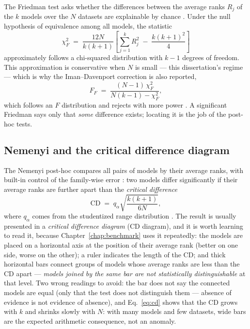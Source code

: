 The Friedman test asks whether the differences between the average
ranks $R_j$ of the $k$ models over the $N$ datasets are explainable
by chance \citep{friedman1937}. Under the null hypothesis of
equivalence among all models, the statistic
\begin{equation}
  \chi^2_F \;=\; \frac{12N}{k(k+1)}
  \left[ \sum_{j=1}^{k} R_j^2 \;-\; \frac{k(k+1)^2}{4} \right]
  \label{eq:friedman}
\end{equation}
approximately follows a chi-squared distribution with $k-1$ degrees
of freedom. This approximation is conservative when $N$ is small
--- this dissertation's regime --- which is why the Iman--Davenport
correction is also reported,
\begin{equation}
  F_F \;=\; \frac{(N-1)\,\chi^2_F}{N(k-1) - \chi^2_F},
  \label{eq:iman-davenport}
\end{equation}
which follows an $F$ distribution and rejects with more power
\citep{imandavenport1980}. A significant Friedman says only that
\emph{some} difference exists; locating it is the job of the
post-hoc tests.

\subsection{Nemenyi and the critical difference diagram}

The Nemenyi post-hoc compares all pairs of models by their average
ranks, with built-in control of the family-wise error
\citep{nemenyi1963}: two models differ significantly if their
average ranks are further apart than the \emph{critical difference}
\begin{equation}
  \mathrm{CD} \;=\; q_\alpha \sqrt{\frac{k(k+1)}{6N}},
  \label{eq:cd}
\end{equation}
where $q_\alpha$ comes from the studentized range distribution
\citep{demsar2006}. The result is usually presented in a
\emph{critical difference diagram} (CD diagram), and it is worth
learning to read it, because Chapter~\ref{chap:benchmark} uses it
repeatedly: the models are placed on a horizontal axis at the
position of their average rank (better on one side, worse on the
other); a ruler indicates the length of the CD; and thick
horizontal bars connect groups of models whose average ranks are
less than the CD apart --- \emph{models joined by the same bar are
not statistically distinguishable} at that level. Two wrong
readings to avoid: the bar does not say the connected models are
equal (only that the test does not distinguish them --- absence of
evidence is not evidence of absence), and Eq.~\ref{eq:cd} shows
that the CD grows with $k$ and shrinks slowly with $N$: with many
models and few datasets, wide bars are the expected arithmetic
consequence, not an anomaly.

